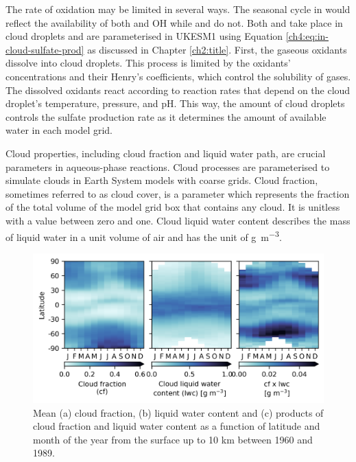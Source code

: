 The rate of oxidation may be limited in several ways. The seasonal cycle in  would reflect the availability of both  and OH while  and  do not. Both  and  take place in cloud droplets and are parameterised in UKESM1 using Equation \ref{ch4:eq:in-cloud-sulfate-prod} as discussed in Chapter \ref{ch2:title}. First, the gaseous oxidants dissolve into cloud droplets. This process is limited by the oxidants' concentrations and their Henry's coefficients, which control the solubility of gases. The dissolved oxidants react according to reaction rates that depend on the cloud droplet's temperature, pressure, and pH. This way, the amount of cloud droplets controls the sulfate production rate as it determines the amount of available water in each model grid.

Cloud properties, including cloud fraction and liquid water path, are crucial parameters in aqueous-phase reactions. Cloud processes are parameterised to simulate clouds in Earth System models with coarse grids. Cloud fraction, sometimes referred to as cloud cover, is a parameter which represents the fraction of the total volume of the model grid box that contains any cloud. It is unitless with a value between zero and one. Cloud liquid water content describes the mass of liquid water in a unit volume of air and has the unit of \unit{\gram\per\cubic\metre}.

\begin{figure}
    \centering
    \includegraphics{Chapter4/Figs/seasonal_cf_lwc_histsst_pothole.png}
    \caption[Mean cloud fraction and liquid water content below 10 km between 1960 and 1989]{Mean (a) cloud fraction, (b) liquid water content and (c) products of cloud fraction and liquid water content as a function of latitude and month of the year from the surface up to 10 km between 1960 and 1989.}
    \label{fig:ch4:seasonal-cf-lwc}
\end{figure}

